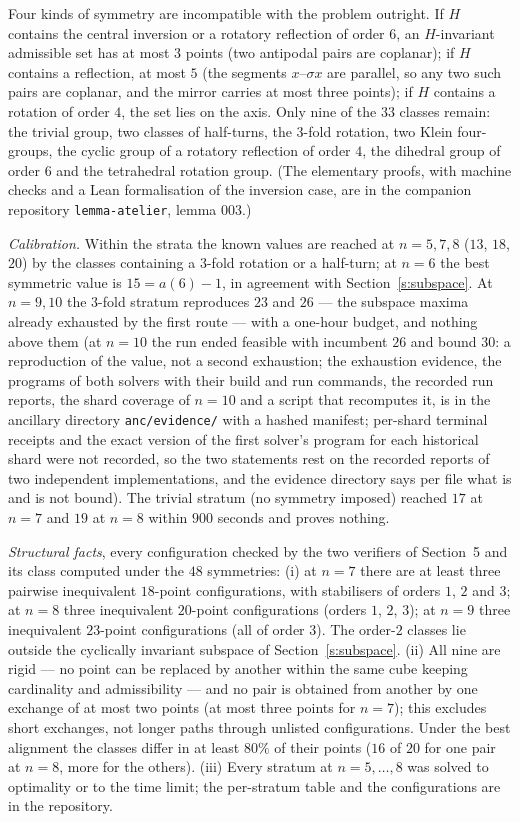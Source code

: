 \documentclass[11pt,a4paper]{article}
\begin{document}
Four kinds of symmetry are incompatible with the problem outright.  If $H$ contains the central
inversion or a rotatory reflection of order $6$, an $H$-invariant admissible set has at most $3$
points (two antipodal pairs are coplanar); if $H$ contains a reflection, at most $5$ (the segments
$x$--$\sigma x$ are parallel, so any two such pairs are coplanar, and the mirror carries at most
three points); if $H$ contains a rotation of order $4$, the set lies on the axis.  Only nine of the
$33$ classes remain: the trivial group, two classes of half-turns, the $3$-fold rotation, two
Klein four-groups, the cyclic group of a rotatory reflection of order $4$, the dihedral group
of order $6$ and the tetrahedral rotation group.  (The elementary proofs, with machine checks
and a Lean formalisation of the inversion case, are in the companion repository
\texttt{lemma-atelier}, lemma 003.)

\emph{Calibration.}  Within the strata the known values are reached at $n=5,7,8$ ($13$, $18$,
$20$) by the classes containing a $3$-fold rotation or a half-turn; at $n=6$ the best symmetric
value is $15=a(6)-1$, in agreement with Section~\ref{s:subspace}.  At $n=9,10$ the $3$-fold
stratum reproduces $23$ and $26$ --- the subspace maxima already exhausted by the first route ---
with a one-hour budget, and nothing above them (at $n=10$ the run ended feasible with incumbent $26$
and bound $30$: a reproduction of the value, not a second exhaustion; the exhaustion evidence, the
programs of both solvers with their build and run commands, the recorded run reports, the shard coverage
of $n=10$ and a script that recomputes it, is in the ancillary directory \texttt{anc/evidence/} with a
hashed manifest; per-shard terminal receipts and the exact version of the first solver's program for
each historical shard were not recorded, so the two statements rest on the recorded reports of two
independent implementations, and the evidence directory says per file what is and is not bound).  The trivial stratum (no symmetry imposed)
reached $17$ at $n=7$ and $19$ at $n=8$ within $900$ seconds and proves nothing.

\emph{Structural facts}, every configuration checked by the two verifiers of Section~5 and its
class computed under the $48$ symmetries: (i) at $n=7$ there are at least three pairwise
inequivalent $18$-point configurations, with stabilisers of orders $1$, $2$ and $3$; at $n=8$
three inequivalent $20$-point configurations (orders $1$, $2$, $3$); at $n=9$ three inequivalent
$23$-point configurations (all of order $3$).  The order-$2$ classes lie outside the cyclically
invariant subspace of Section~\ref{s:subspace}.  (ii) All nine are rigid --- no point can be
replaced by another within the same cube keeping cardinality and admissibility --- and no pair is
obtained from another by one exchange of at most two points (at most three points for $n=7$); this
excludes short exchanges, not longer paths through unlisted configurations.  Under the best alignment the classes differ in at least $80\%$ of
their points ($16$ of $20$ for one pair at $n=8$, more for the others).  (iii) Every stratum at $n=5,\dots,8$ was solved to optimality or to the time limit;
the per-stratum table and the configurations are in the repository.
\end{document}

